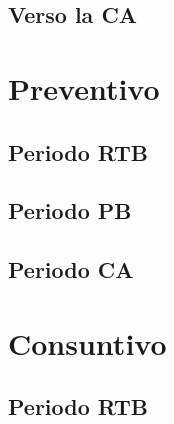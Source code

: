 \documentclass[5pt]{article}
\begin{document}
\subsection{Verso la CA}

\section{Preventivo}
\subsection{Periodo RTB}
\subsection{Periodo PB}
\subsection{Periodo CA}

\section{Consuntivo}
\subsection{Periodo RTB}
\end{document}
